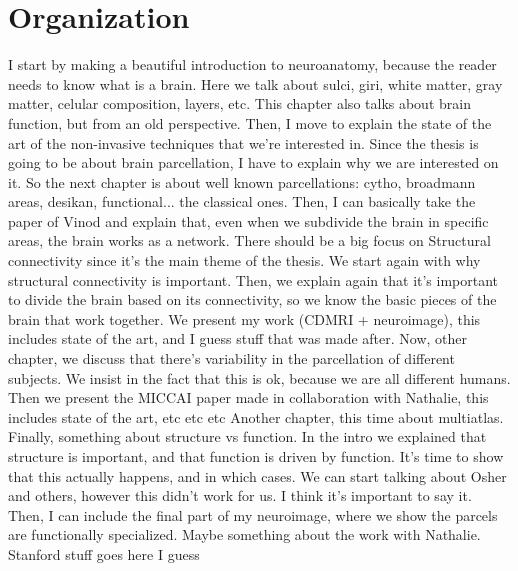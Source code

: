 \section{Organization}
I start by making a beautiful introduction to neuroanatomy, because the reader needs to know what is a brain.
Here we talk about sulci, giri, white matter, gray matter, celular composition, layers, etc.
This chapter also talks about brain function, but from an old perspective.
Then, I move to explain the state of the art of the non-invasive techniques that we're interested in.
Since the thesis is going to be about brain parcellation, I have to explain why we are interested on it.
So the next chapter is about well known parcellations: cytho, broadmann areas, desikan, functional... the classical ones.
Then, I can basically take the paper of Vinod and explain that, even when we subdivide the brain in specific areas, the brain works as a network.
There should be a big focus on Structural connectivity since it's the main theme of the thesis.
We start again with why structural connectivity is important.
Then, we explain again that it's important to divide the brain based on its connectivity, so we know the basic pieces of the brain that work together.
We present my work (CDMRI + neuroimage), this includes state of the art, and I guess stuff that was made after.
Now, other chapter, we discuss that there's variability in the parcellation of different subjects.
We insist in the fact that this is ok, because we are all different humans. 
Then we present the MICCAI paper made in collaboration with Nathalie, this includes state of the art, etc etc etc
%
Another chapter, this time about multiatlas.
Finally, something about structure vs function.
In the intro we explained that structure is important, and that function is driven by function.
It's time to show that this actually happens, and in which cases.
We can start talking about Osher and others, however this didn't work for us.
I think it's important to say it.
Then, I can include the final part of my neuroimage, where we show the parcels are functionally specialized.
Maybe something about the work with Nathalie.
Stanford stuff goes here I guess
%



